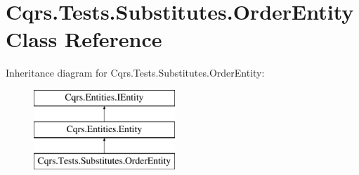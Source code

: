 \hypertarget{classCqrs_1_1Tests_1_1Substitutes_1_1OrderEntity}{}\section{Cqrs.\+Tests.\+Substitutes.\+Order\+Entity Class Reference}
\label{classCqrs_1_1Tests_1_1Substitutes_1_1OrderEntity}
Inheritance diagram for Cqrs.\+Tests.\+Substitutes.\+Order\+Entity\+:\begin{figure}[H]
\begin{center}
\leavevmode
\includegraphics[height=3.000000cm]{classCqrs_1_1Tests_1_1Substitutes_1_1OrderEntity}
\end{center}
\end{figure}
